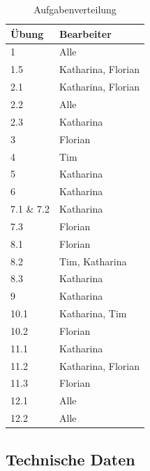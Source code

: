 \documentclass[12pt,a4paper,bibliography=totocnumbered,listof=totocnumbered]{scrartcl}
\begin{document}
    \begin{table}[h]
        \centering
        \caption{Aufgabenverteilung}
        \label{tab:Aufgabenverteilung}
        \begin{tabular}{|l|l|}
            \hline
            \textbf{Übung} & \textbf{Bearbeiter} \\ \hline
            1 & Alle  \\ \hline
            1.5 & Katharina, Florian   \\ \hline
            2.1 &  Katharina, Florian     \\ \hline
            2.2 &  Alle      \\ \hline
            2.3 &  Katharina      \\ \hline
            3 &    Florian    \\ \hline
            4   &      Tim  \\ \hline
            5   &      Katharina  \\ \hline
            6   &    Katharina    \\ \hline
            7.1 \& 7.2  &     Katharina   \\ \hline
            7.3 &    Florian    \\ \hline
            8.1 &    Florian    \\ \hline
            8.2 &    Tim, Katharina    \\ \hline
            8.3 &    Katharina    \\ \hline
            9 &     Katharina   \\ \hline
            10.1 &    Katharina, Tim    \\ \hline
            10.2 &     Florian   \\ \hline
            11.1 &   Katharina     \\ \hline
            11.2 &   Katharina, Florian     \\ \hline
            11.3 &   Florian    \\ \hline
            12.1 &    Alle    \\ \hline
            12.2 &    Alle    \\ \hline
        \end{tabular}
    \end{table}
\newpage
    \subsection{Technische Daten}
    \vspace{1em}
\end{document}
